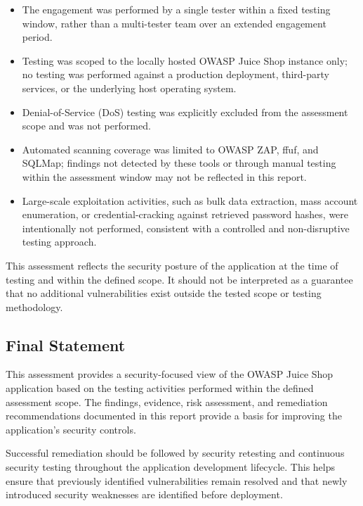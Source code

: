 \begin{itemize}
    \item The engagement was performed by a single tester within a
    fixed testing window, rather than a multi-tester team over an
    extended engagement period.

    \item Testing was scoped to the locally hosted OWASP Juice Shop
    instance only; no testing was performed against a production
    deployment, third-party services, or the underlying host
    operating system.

    \item Denial-of-Service (DoS) testing was explicitly excluded
    from the assessment scope and was not performed.

    \item Automated scanning coverage was limited to OWASP ZAP,
    ffuf, and SQLMap; findings not detected by these tools or through
    manual testing within the assessment window may not be reflected
    in this report.

    \item Large-scale exploitation activities, such as bulk data
    extraction, mass account enumeration, or credential-cracking
    against retrieved password hashes, were intentionally not
    performed, consistent with a controlled and non-disruptive
    testing approach.
\end{itemize}

This assessment reflects the security posture of the application at
the time of testing and within the defined scope. It should not be
interpreted as a guarantee that no additional vulnerabilities exist
outside the tested scope or testing methodology.

\subsection*{Final Statement}

This assessment provides a security-focused view of the OWASP Juice
Shop application based on the testing activities performed within
the defined assessment scope. The findings, evidence, risk
assessment, and remediation recommendations documented in this
report provide a basis for improving the application's security
controls.

Successful remediation should be followed by security retesting and
continuous security testing throughout the application development
lifecycle. This helps ensure that previously identified
vulnerabilities remain resolved and that newly introduced security
weaknesses are identified before deployment.